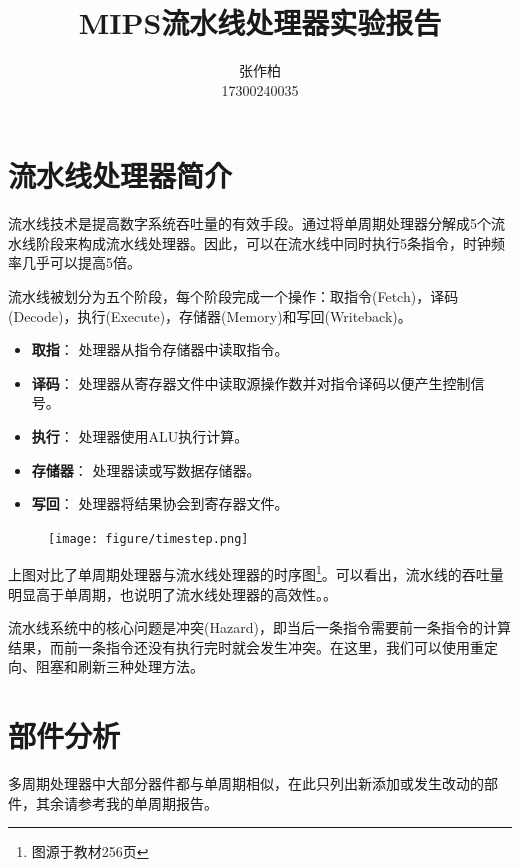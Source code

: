 \documentclass[12pt]{article} %
\title{\textbf{MIPS流水线处理器实验报告}}
\author{张作柏\\17300240035}
\begin{document}
\begin{sloppypar}
\maketitle

\pagestyle{fancy}
\lhead{\textbf{{\thetitle}}}
\rhead{\textbf{\nouppercase{\firstleftmark}}}
\cfoot{\thepage}

\thispagestyle{empty}
\tableofcontents
\clearpage

\setcounter{page}{1}

\section{流水线处理器简介}

流水线技术是提高数字系统吞吐量的有效手段。通过将单周期处理器分解成5个流水线阶段来构成流水线处理器。因此，可以在流水线中同时执行5条指令，时钟频率几乎可以提高5倍。

流水线被划分为五个阶段，每个阶段完成一个操作：取指令(Fetch)，译码(Decode)，执行(Execute)，存储器(Memory)和写回(Writeback)。
\begin{itemize}
\item {\bf 取指}： 处理器从指令存储器中读取指令。
\item {\bf 译码}： 处理器从寄存器文件中读取源操作数并对指令译码以便产生控制信号。
\item {\bf 执行}： 处理器使用ALU执行计算。
\item {\bf 存储器}： 处理器读或写数据存储器。
\item {\bf 写回}： 处理器将结果协会到寄存器文件。
\end{itemize}

\begin{figure}[h]
\centering
\texttt{[image: figure/timestep.png]}
\end{figure}

上图对比了单周期处理器与流水线处理器的时序图\footnote{图源于教材256页}。可以看出，流水线的吞吐量明显高于单周期，也说明了流水线处理器的高效性。。

流水线系统中的核心问题是冲突(Hazard)，即当后一条指令需要前一条指令的计算结果，而前一条指令还没有执行完时就会发生冲突。在这里，我们可以使用重定向、阻塞和刷新三种处理方法。

\newpage
\section{部件分析}

多周期处理器中大部分器件都与单周期相似，在此只列出新添加或发生改动的部件，其余请参考我的单周期报告。


\end{sloppypar}
\end{document}
